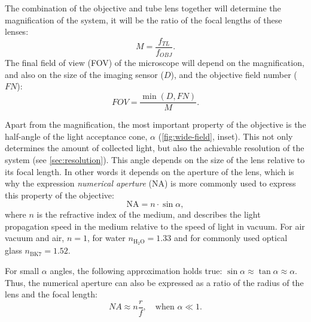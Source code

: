     The combination of the objective and tube lens together will determine the magnification of the system, it will be the ratio of the focal lengths of these lenses:
    \begin{equation}
      M = \frac{f_{TL}}{f_{OBJ}}.
      \label{eq:magnification}
    \end{equation}
    The final field of view (FOV) of the microscope will depend on the magnification, and also on the size of the imaging sensor ($D$), and the objective field number ($FN$):
    \begin{equation}
      FOV = \frac{\min(D, FN)}{M}.
      \label{eq:FOV}
    \end{equation}

    Apart from the magnification, the most important property of the objective is the half-angle of the light acceptance cone, $\alpha$ (\autoref{fig:wide-field}, inset). This not only determines the amount of collected light, but also the achievable resolution of the system (see \autoref{sec:resolution}). This angle depends on the size of the lens relative to its focal length. In other words it depends on the aperture of the lens, which is why the expression \textit{numerical aperture} (NA) is more commonly used to express this property of the objective:
    \begin{equation}
      \text{NA} = n\cdot \sin \alpha,
      \label{eq:NA}
    \end{equation}
    where $n$ is the refractive index of the medium, and describes the light propagation speed in the medium relative to the speed of light in vacuum. For air vacuum and air, $n=1$, for water $n_\mathrm{H_2O}=1.33$ and for commonly used optical glass $n_\mathrm{BK7} = 1.52$.

    For small $\alpha$ angles, the following approximation holds true: $\sin \alpha \approx \tan \alpha \approx \alpha$. Thus, the numerical aperture can also be expressed as a ratio of the radius of the lens and the focal length:
    \begin{equation}
      NA \approx n \frac{r}{f},\quad \text{when }\alpha \ll 1.
    \end{equation}



